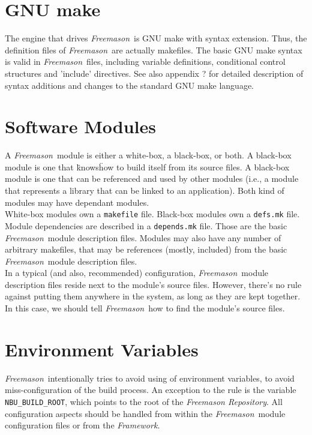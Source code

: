 \documentclass[a4paper]{article}
\newcommand{\freemason}{\textit{Freemason}}
\newcommand{\concept}[1]{\textit{#1}}
\begin{document}
\section{GNU make}
    The engine that drives \freemason\ is GNU make with syntax extension.
    Thus, the definition files of \freemason\ are actually makefiles. The basic GNU make syntax is valid in \freemason\ files,
    including variable definitions, conditional control structures and 'include' directives.
    See also appendix ? for detailed description of syntax additions and changes to the standard GNU make language.

\section{Software Modules}
    A \freemason\ module is either a white-box, a black-box, or both. A black-box module is one that
    \"knows\" how to build itself from its source files. A black-box module is one that can be referenced and used by
    other modules (i.e., a module that represents a library that can be linked to an application).
    Both kind of modules may have dependant modules.
    \\
    White-box modules own a \verb"makefile" file. Black-box modules own a \verb"defs.mk" file. Module dependencies are described
    in a \verb"depends.mk" file. Those are the basic \freemason\ module description files. Modules may also have any number of arbitrary
    makefiles, that may be references (mostly, included) from the basic \freemason\ module description files.
    \\
    In a typical (and also, recommended) configuration, \freemason\ module description files reside next to the module's source files.
    However, there's no rule against putting them anywhere in the system, as long as they are kept together. In this case, we should tell
    \freemason\ how to find the module's source files.

\section{Environment Variables}
    \freemason\ intentionally tries to avoid using of environment variables, to avoid miss-configuration of the build process.
    An exception to the rule is the variable \verb"NBU_BUILD_ROOT", which points to the root of the \concept{Freemason Repository}.
	All configuration aspects should be handled from within the \freemason\ module configuration files or from the \concept{Framework}.
\end{document}
